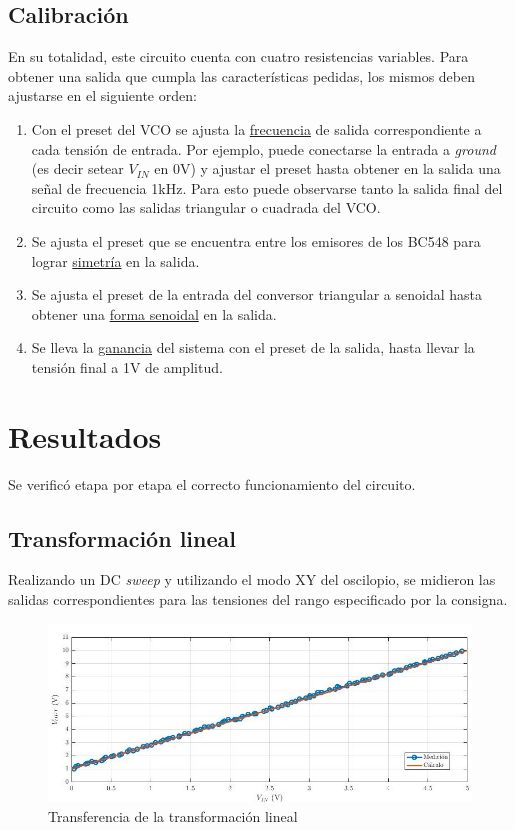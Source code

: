 \documentclass[../../tc_tp6_main.tex]{subfiles}
\begin{document}
\subsection{Calibraci\'on} \label{ssection:cal}


En su totalidad, este circuito cuenta con cuatro resistencias variables. Para obtener una salida que cumpla las caracter\'isticas pedidas, los mismos deben ajustarse en el siguiente orden:

\begin{enumerate}
	\item Con el preset del VCO se ajusta la \underline{frecuencia} de salida correspondiente a cada tensi\'on de entrada. Por ejemplo, puede conectarse la entrada a \textit{ground} (es decir setear $V_{IN}$ en 0V) y ajustar el preset hasta obtener en la salida una se\~nal de frecuencia 1kHz. Para esto puede observarse tanto la salida final del circuito como las salidas triangular o cuadrada del VCO.
	\item Se ajusta el preset que se encuentra entre los emisores de los BC548 para lograr \underline{simetr\'ia} en la salida.
	\item Se ajusta el preset de la entrada del conversor triangular a senoidal hasta obtener una \underline{forma senoidal} en la salida.
	\item Se lleva la \underline{ganancia} del sistema con el preset de la salida, hasta llevar la tensi\'on final a 1V de amplitud. 
\end{enumerate}

\newpage

\section{Resultados}

Se verific\'o etapa por etapa el correcto funcionamiento del circuito.

\subsection{Transformaci\'on lineal}

Realizando un DC \textit{sweep} y utilizando el modo XY del oscilopio, se midieron las salidas correspondientes para las tensiones del rango especificado por la consigna.

\begin{figure}[H]
	\centering
	\includegraphics[scale=0.71]{imagenes/tc_tp6_ej3_tl.jpg}
	\caption{Transferencia de la transformaci\'on lineal}
\end{figure}
\end{document}
